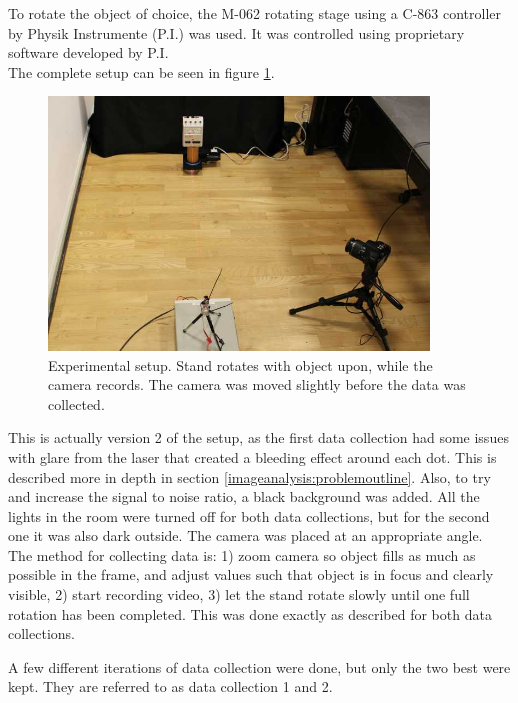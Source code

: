 To rotate the object of choice, the M-062 rotating stage \cite{rotationStage} using a C-863 controller\cite{rotationStageController} by Physik Instrumente (P.I.) was used. It was controlled using proprietary software developed by P.I. \\

The complete setup can be seen in figure \ref{fig:testsetup_world}. 
\begin{figure}[h]
    \centering
    \includegraphics[width=0.9\textwidth]{figures/reconstruction/IMG_0001.JPG}
    \caption{Experimental setup. Stand rotates with object upon, while the camera records. The camera was moved slightly before the data was collected.}
    \label{fig:testsetup_world}
\end{figure}

This is actually version 2 of the setup, as the first data collection had some issues with glare from the laser that created a bleeding effect around each dot. This is described more in depth in section \ref{imageanalysis:problemoutline}. Also, to try and increase the signal to noise ratio, a black background was added. All the lights in the room were turned off for both data collections, but for the second one it was also dark outside. 
The camera was placed at an appropriate angle. \\

The method for collecting data is: 1) zoom camera so object fills as much as possible in the frame, and adjust values such that object is in focus and clearly visible, 2) start recording video, 3) let the stand rotate slowly until one full rotation has been completed. This was done exactly as described for both data collections. 


A few different iterations of data collection were done, but only the two best were kept. They are referred to as data collection 1 and 2. \\

